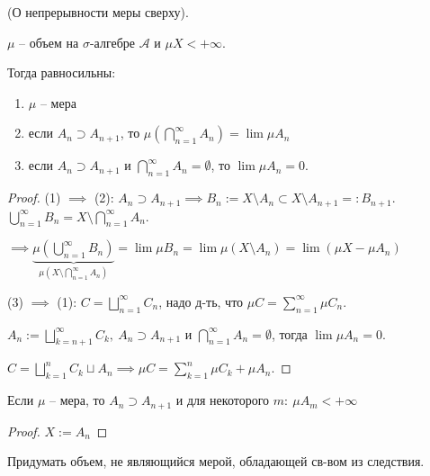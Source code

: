 \begin{theorem}
    (О непрерывности меры сверху).

    $\mu$ -- объем на $\sigma$-алгебре $\mathcal{A}$ и $\mu X < +\infty$.

    Тогда равносильны: 
    \begin{enumerate}
        \item $\mu$ -- мера
        \item если $A_n \supset A_{n+1}$, то $\mu \left(\bigcap_{n=1}^{\infty} A_n\right) = \lim \mu A_n$
        \item если $A_n \supset A_{n+1}$ и $\bigcap_{n=1}^{\infty} A_n = \emptyset$, то $\lim \mu A_n = 0$.
    \end{enumerate}
\end{theorem}

\begin{proof}
    (1) $\implies $ (2): $A_n \supset A_{n+1} \implies B_n := X \setminus A_n \subset X \setminus A_{n+1} =: B_{n+1}$. $\bigcup_{n=1}^{\infty} B_n = X \setminus \bigcap_{n=1}^{\infty} A_n$.

    $\implies \underbrace{\mu \left( \bigcup_{n=1}^{\infty} B_n \right)}_{\mu (X \setminus \bigcap_{n=1}^{\infty} A_n)} = \lim \mu B_n = \lim \mu (X \setminus A_n) = \lim (\mu X - \mu A_n)$


    (3) $\implies $ (1): $C = \bigsqcup_{n=1}^{\infty} C_n$, надо д-ть, что $\mu C = \sum_{n=1}^{\infty} \mu C_n$.

    $A_n := \bigsqcup_{k=n + 1}^{\infty} C_k, \ A_n \supset A_{n+1}$ и $\bigcap_{n=1}^{\infty} A_n = \emptyset$, тогда $\lim \mu A_n = 0$.

    $C = \bigsqcup_{k=1}^{n} C_k \sqcup A_n \implies \mu C  = \sum_{k=1}^{n} \mu C_k + \mu A_n$.
\end{proof}

\begin{consequence}
    Если $\mu$ -- мера, то $A_n \supset A_{n+1}$ и для некоторого $m: \ \mu A_m < +\infty$
\end{consequence}
\begin{proof}
    $X := A_n$
\end{proof}
\begin{exerc}
    Придумать объем, не являющийся мерой, обладающей св-вом из следствия. 
\end{exerc}

